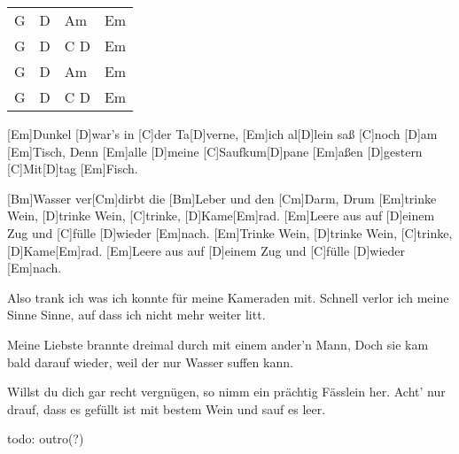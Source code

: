 

\begin{guitar}	
	{\footnotesize\begin{tabular}{l|l|l|l}
			G & D & Am & Em \\
			G & D & C D & Em \\
			G & D & Am & Em \\
			G & D & C D & Em
	\end{tabular}}

	[Em]Dunkel [D]war's in [C]der Ta[D]verne, [Em]ich al[D]lein saß [C]noch [D]am [Em]Tisch,
	Denn [Em]alle [D]meine [C]Saufkum[D]pane [Em]aßen [D]gestern [C]Mit[D]tag [Em]Fisch.
	
	[Bm]Wasser ver[Cm]dirbt die [Bm]Leber und den [Cm]Darm,
	Drum [Em]trinke Wein, [D]trinke Wein, [C]trinke, [D]Kame[Em]rad.
	[Em]Leere aus auf [D]einem Zug und [C]fülle [D]wieder [Em]nach.
	[Em]Trinke Wein, [D]trinke Wein, [C]trinke, [D]Kame[Em]rad.
	[Em]Leere aus auf [D]einem Zug und [C]fülle [D]wieder [Em]nach.
	
	
	Also trank ich was ich konnte für meine Kameraden mit.
	Schnell verlor ich meine Sinne Sinne, auf dass ich nicht mehr weiter litt.
	
	 
	
	
	Meine Liebste brannte dreimal durch mit einem ander'n Mann,
	Doch sie kam bald darauf wieder, weil der nur Wasser suffen kann.
	
	 
	
	
	Willst du dich gar recht vergnügen, so nimm ein prächtig Fässlein her.
	Acht' nur drauf, dass es gefüllt ist mit bestem Wein und sauf es leer.
	
	  {\color{gray}todo: outro(?)}
\end{guitar}




